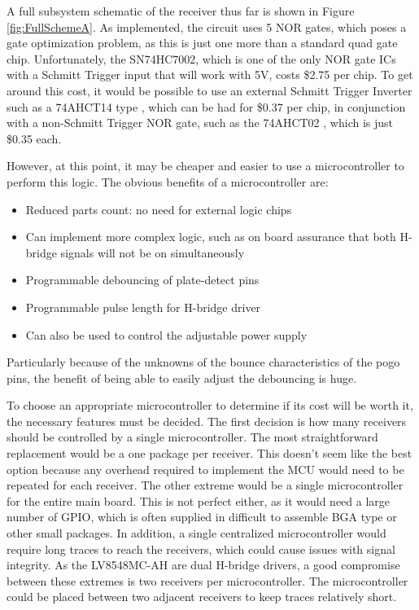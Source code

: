 \documentclass{article}
\begin{document}
		A full subsystem schematic of the receiver thus far is shown in Figure \ref{fig:FullSchemeA}.  As implemented, the circuit uses 5 NOR gates, which poses a gate optimization problem, as this is just one more than a standard quad gate chip.  Unfortunately, the SN74HC7002, which is one of the only NOR gate ICs with a Schmitt Trigger input that will work with 5V, costs \$2.75 per chip.  To get around this cost, it would be possible to use an external Schmitt Trigger Inverter such as a 74AHCT14 type \cite{74HCT14datasheet}, which can be had for \$0.37 per chip, in conjunction with a non-Schmitt Trigger NOR gate, such as the 74AHCT02 \cite{74AHCT02datasheet}, which is just \$0.35 each.

		However, at this point, it may be cheaper and easier to use a microcontroller to perform this logic.  The obvious benefits of a microcontroller are:
		
		\begin{itemize}
			\item Reduced parts count: no need for external logic chips
			\item Can implement more complex logic, such as on board assurance that both H-bridge signals will not be on simultaneously
			\item Programmable debouncing of plate-detect pins
			\item Programmable pulse length for H-bridge driver
			\item Can also be used to control the adjustable power supply
		\end{itemize}

		Particularly because of the unknowns of the bounce characteristics of the pogo pins, the benefit of being able to easily adjust the debouncing is huge.

		To choose an appropriate microcontroller to determine if its cost will be worth it, the necessary features must be decided.  The first decision is how many receivers should be controlled by a single microcontroller.  The most straightforward replacement would be a one package per receiver.  This doesn't seem like the best option because any overhead required to implement the MCU would need to be repeated for each receiver.  The other extreme would be a single microcontroller for the entire main board.  This is not perfect either, as it would need a large number of GPIO, which is often supplied in difficult to assemble BGA type or other small packages.  In addition, a single centralized microcontroller would require long traces to reach the receivers, which could cause issues with signal integrity.  As the LV8548MC-AH are dual H-bridge drivers, a good compromise between these extremes is two receivers per microcontroller.  The microcontroller could be placed between two adjacent receivers to keep traces relatively short.
\end{document}
